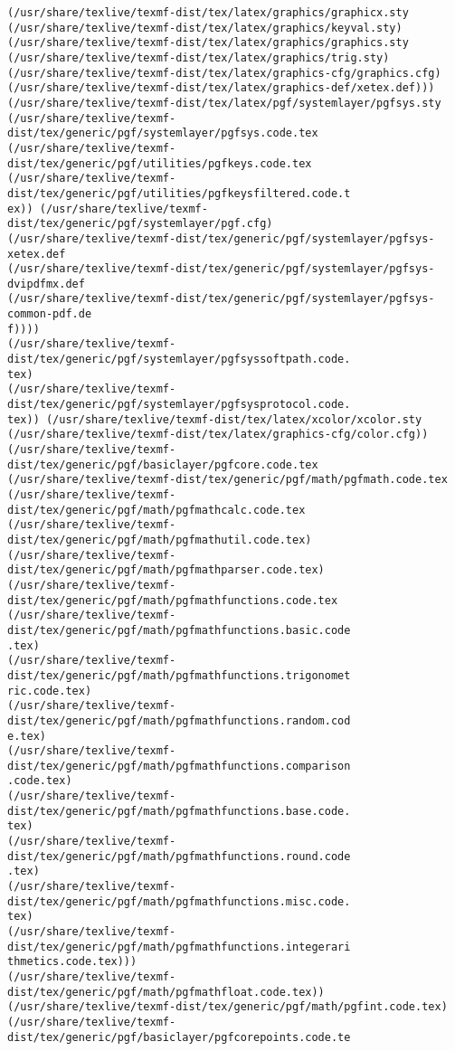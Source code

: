 \documentclass[11pt]{article}
\begin{document}
\begin{Verbatim}[commandchars=\\\{\}]
(/usr/share/texlive/texmf-dist/tex/latex/graphics/graphicx.sty
(/usr/share/texlive/texmf-dist/tex/latex/graphics/keyval.sty)
(/usr/share/texlive/texmf-dist/tex/latex/graphics/graphics.sty
(/usr/share/texlive/texmf-dist/tex/latex/graphics/trig.sty)
(/usr/share/texlive/texmf-dist/tex/latex/graphics-cfg/graphics.cfg)
(/usr/share/texlive/texmf-dist/tex/latex/graphics-def/xetex.def)))
(/usr/share/texlive/texmf-dist/tex/latex/pgf/systemlayer/pgfsys.sty
(/usr/share/texlive/texmf-dist/tex/generic/pgf/systemlayer/pgfsys.code.tex
(/usr/share/texlive/texmf-dist/tex/generic/pgf/utilities/pgfkeys.code.tex
(/usr/share/texlive/texmf-dist/tex/generic/pgf/utilities/pgfkeysfiltered.code.t
ex)) (/usr/share/texlive/texmf-dist/tex/generic/pgf/systemlayer/pgf.cfg)
(/usr/share/texlive/texmf-dist/tex/generic/pgf/systemlayer/pgfsys-xetex.def
(/usr/share/texlive/texmf-dist/tex/generic/pgf/systemlayer/pgfsys-dvipdfmx.def
(/usr/share/texlive/texmf-dist/tex/generic/pgf/systemlayer/pgfsys-common-pdf.de
f))))
(/usr/share/texlive/texmf-dist/tex/generic/pgf/systemlayer/pgfsyssoftpath.code.
tex)
(/usr/share/texlive/texmf-dist/tex/generic/pgf/systemlayer/pgfsysprotocol.code.
tex)) (/usr/share/texlive/texmf-dist/tex/latex/xcolor/xcolor.sty
(/usr/share/texlive/texmf-dist/tex/latex/graphics-cfg/color.cfg))
(/usr/share/texlive/texmf-dist/tex/generic/pgf/basiclayer/pgfcore.code.tex
(/usr/share/texlive/texmf-dist/tex/generic/pgf/math/pgfmath.code.tex
(/usr/share/texlive/texmf-dist/tex/generic/pgf/math/pgfmathcalc.code.tex
(/usr/share/texlive/texmf-dist/tex/generic/pgf/math/pgfmathutil.code.tex)
(/usr/share/texlive/texmf-dist/tex/generic/pgf/math/pgfmathparser.code.tex)
(/usr/share/texlive/texmf-dist/tex/generic/pgf/math/pgfmathfunctions.code.tex
(/usr/share/texlive/texmf-dist/tex/generic/pgf/math/pgfmathfunctions.basic.code
.tex)
(/usr/share/texlive/texmf-dist/tex/generic/pgf/math/pgfmathfunctions.trigonomet
ric.code.tex)
(/usr/share/texlive/texmf-dist/tex/generic/pgf/math/pgfmathfunctions.random.cod
e.tex)
(/usr/share/texlive/texmf-dist/tex/generic/pgf/math/pgfmathfunctions.comparison
.code.tex)
(/usr/share/texlive/texmf-dist/tex/generic/pgf/math/pgfmathfunctions.base.code.
tex)
(/usr/share/texlive/texmf-dist/tex/generic/pgf/math/pgfmathfunctions.round.code
.tex)
(/usr/share/texlive/texmf-dist/tex/generic/pgf/math/pgfmathfunctions.misc.code.
tex)
(/usr/share/texlive/texmf-dist/tex/generic/pgf/math/pgfmathfunctions.integerari
thmetics.code.tex)))
(/usr/share/texlive/texmf-dist/tex/generic/pgf/math/pgfmathfloat.code.tex))
(/usr/share/texlive/texmf-dist/tex/generic/pgf/math/pgfint.code.tex)
(/usr/share/texlive/texmf-dist/tex/generic/pgf/basiclayer/pgfcorepoints.code.te

\end{Verbatim}
\end{document}
